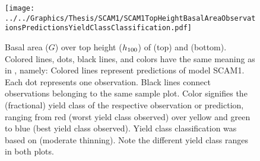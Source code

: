 \begin{figure}[h]
  \centering
  \texttt{[image: ../../Graphics/Thesis/SCAM1/SCAM1TopHeightBasalAreaObservationsPredictionsYieldClassClassification.pdf]}
  \caption{Basal area (\(G\)) over top height (\(h_{100}{}\)) of \Beech{} (top) and \Spruce{} (bottom).  Colored lines, dots, black lines, and colors have the same meaning as in , namely:  Colored lines represent predictions of model SCAM1.  Each dot represents one observation.  Black lines connect observations belonging to the same sample plot.  Color signifies the (fractional) yield class of the respective observation or prediction, ranging from red (worst yield class observed) over yellow and green to blue (best yield class observed). Yield class classification was based on \textcite{Schober1995} (moderate thinning).  Note the different yield class ranges in both plots.}
  \label{fig:SCAM1TopHeightBasalAreaObservationsPredictionsYieldClassClassification}
\end{figure}

\clearpage{}

